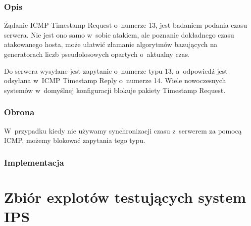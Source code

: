 \documentclass[a4paper,12pt]{book}
\begin{document}
		\subsection{Opis}
			Żądanie ICMP Timestamp Request o~numerze 13, jest badaniem podania czasu serwera.
			Nie jest ono samo w~sobie atakiem, ale poznanie dokładnego czasu atakowanego hosta, może ułatwić złamanie algorytmów bazujących na generatorach liczb pseudolosowych opartych o~aktualny czas.
			
			Do serwera wysyłane jest zapytanie o~numerze typu 13, a~odpowiedź jest odsyłana w~ICMP Timestamp Reply o~numerze 14. Wiele nowoczesnych systemów w~domyślnej konfiguracji blokuje pakiety Timestamp Request.
		\subsection{Obrona}
			W~przypadku kiedy nie używamy synchronizacji czasu z~serwerem za pomocą ICMP, możemy blokować zapytania tego typu.
		\subsection{Implementacja}
			\footnotesize
			\normalsize
\appendix
\chapter{Zbiór explotów testujących system IPS}
\end{document}
